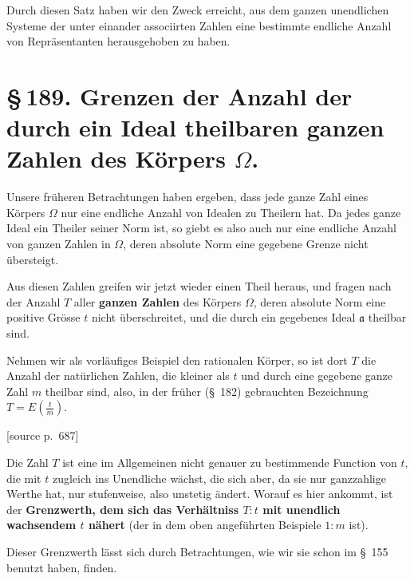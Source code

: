 \documentclass[11pt]{article}
\newcommand{\srcpage}[1]{\par\medskip\noindent\textsf{[source p.~#1]}\par\smallskip}
\begin{document}
Durch diesen Satz haben wir den Zweck erreicht, aus dem ganzen unendlichen Systeme der unter einander associirten Zahlen eine bestimmte endliche Anzahl von Repräsentanten herausgehoben zu haben.

\section*{\S\,189. Grenzen der Anzahl der durch ein Ideal theilbaren ganzen Zahlen des Körpers $\Omega$.}

Unsere früheren Betrachtungen haben ergeben, dass jede ganze Zahl eines Körpers $\Omega$ nur eine endliche Anzahl von Idealen zu Theilern hat. Da jedes ganze Ideal ein Theiler seiner Norm ist, so giebt es also auch nur eine endliche Anzahl von ganzen Zahlen in $\Omega$, deren absolute Norm eine gegebene Grenze nicht übersteigt.

Aus diesen Zahlen greifen wir jetzt wieder einen Theil heraus, und fragen nach der Anzahl $T$ aller \textbf{ganzen Zahlen} des Körpers $\Omega$, deren absolute Norm eine positive Grösse $t$ nicht überschreitet, und die durch ein gegebenes Ideal $\mathfrak a$ theilbar sind.

Nehmen wir als vorläufiges Beispiel den rationalen Körper, so ist dort $T$ die Anzahl der natürlichen Zahlen, die kleiner als $t$ und durch eine gegebene ganze Zahl $m$ theilbar sind, also, in der früher (\S~182) gebrauchten Bezeichnung $T=E\left(\frac{t}{m}\right)$.

\srcpage{687}
Die Zahl $T$ ist eine im Allgemeinen nicht genauer zu bestimmende Function von $t$, die mit $t$ zugleich ins Unendliche wächst, die sich aber, da sie nur ganzzahlige Werthe hat, nur stufenweise, also unstetig ändert. Worauf es hier ankommt, ist der \textbf{Grenzwerth, dem sich das Verhältniss $T:t$ mit unendlich wachsendem $t$ nähert} (der in dem oben angeführten Beispiele $1:m$ ist).

Dieser Grenzwerth lässt sich durch Betrachtungen, wie wir sie schon im \S~155 benutzt haben, finden.
\end{document}
